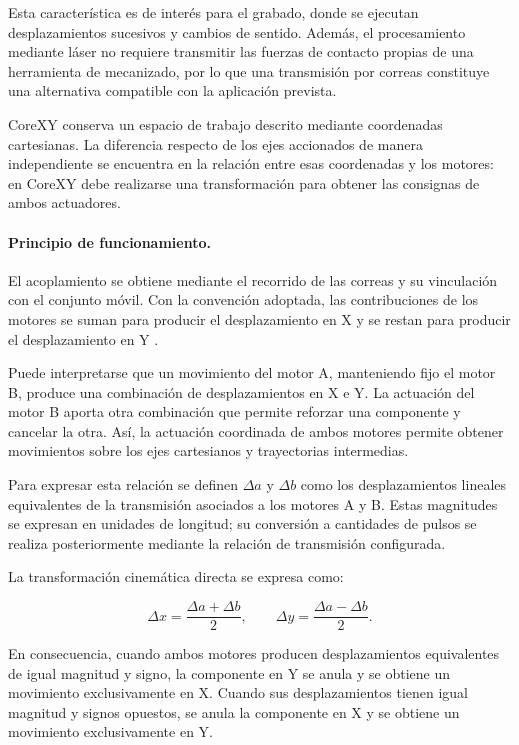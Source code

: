 \documentclass[blue,fullpaper]{ludusofficial}  %
\begin{document}
Esta característica es de interés para
el grabado, donde se ejecutan desplazamientos
sucesivos y cambios de sentido.
Además, el procesamiento mediante láser
no requiere transmitir las fuerzas
de contacto propias de una herramienta
de mecanizado, por lo que una transmisión
por correas constituye una alternativa
compatible con la aplicación prevista.

CoreXY conserva un espacio de trabajo
descrito mediante coordenadas cartesianas.
La diferencia respecto de los ejes
accionados de manera independiente
se encuentra en la relación entre
esas coordenadas y los motores:
en CoreXY debe realizarse una transformación
para obtener las consignas de ambos
actuadores.

\paragraph{Principio de funcionamiento.}

El acoplamiento se obtiene mediante
el recorrido de las correas y su vinculación
con el conjunto móvil. Con la convención
adoptada, las contribuciones de los motores
se suman para producir el desplazamiento
en X y se restan para producir
el desplazamiento en Y
\cite{corexy_teoria}.

Puede interpretarse que un movimiento
del motor A, manteniendo fijo el motor B,
produce una combinación de desplazamientos
en X e Y. La actuación del motor B aporta
otra combinación que permite reforzar
una componente y cancelar la otra.
Así, la actuación coordinada de ambos
motores permite obtener movimientos
sobre los ejes cartesianos y trayectorias
intermedias.

Para expresar esta relación se definen
$\Delta a$ y $\Delta b$ como los
desplazamientos lineales equivalentes
de la transmisión asociados a los
motores A y B. Estas magnitudes se
expresan en unidades de longitud;
su conversión a cantidades de pulsos
se realiza posteriormente mediante
la relación de transmisión configurada.

La transformación cinemática directa
se expresa como:

\begin{equation}
    \Delta x = \frac{\Delta a + \Delta b}{2},
    \qquad
    \Delta y = \frac{\Delta a - \Delta b}{2}.
    \label{eq:corexy-directa}
\end{equation}

En consecuencia, cuando ambos motores
producen desplazamientos equivalentes
de igual magnitud y signo, la componente
en Y se anula y se obtiene un movimiento
exclusivamente en X. Cuando sus
desplazamientos tienen igual magnitud
y signos opuestos, se anula la componente
en X y se obtiene un movimiento
exclusivamente en Y.
\end{document}
